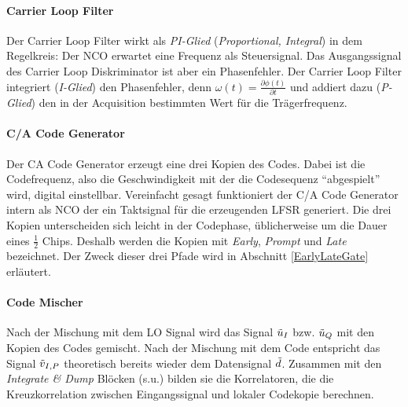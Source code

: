 \paragraph{Carrier Loop Filter} Der Carrier Loop Filter wirkt als \emph{PI-Glied} (\emph{Proportional, Integral}) in dem Regelkreis: Der NCO erwartet eine Frequenz als Steuersignal. Das Ausgangssignal des Carrier Loop Diskriminator ist aber ein Phasenfehler. Der Carrier Loop Filter integriert (\emph{I-Glied}) den Phasenfehler, denn $\omega(t)=\frac{\partial \phi(t)}{\partial t}$ und addiert dazu (\emph{P-Glied}) den in der Acquisition bestimmten Wert für die Trägerfrequenz.

\paragraph{C/A Code Generator} Der \gls{CA} Code Generator erzeugt eine drei Kopien des Codes. Dabei ist die Codefrequenz, also die Geschwindigkeit mit der die Codesequenz \enquote{abgespielt} wird, digital einstellbar. Vereinfacht gesagt  funktioniert der C/A Code Generator intern als \gls{NCO} der ein Taktsignal für die erzeugenden \gls{LFSR} generiert. Die drei Kopien unterscheiden sich leicht in der Codephase, üblicherweise um die Dauer eines $\frac{1}{2}$ Chips. Deshalb werden die Kopien mit \emph{Early}, \emph{Prompt} und \emph{Late} bezeichnet. Der Zweck dieser drei Pfade wird in Abschnitt \ref{EarlyLateGate} erläutert.

\paragraph{Code Mischer} Nach der Mischung mit dem LO Signal wird das Signal $\tilde{u}_I$ bzw. $\tilde{u}_Q$ mit den Kopien des Codes gemischt. Nach der Mischung mit dem Code entspricht das Signal $\tilde{v}_{I,P}$ theoretisch bereits wieder dem Datensignal $\tilde{d}$. Zusammen mit den \emph{Integrate \& Dump} Blöcken (s.u.) bilden sie die Korrelatoren, die die Kreuzkorrelation zwischen Eingangssignal und lokaler Codekopie berechnen.

